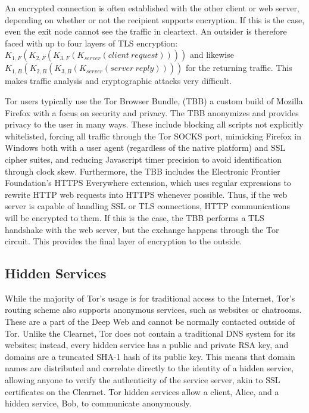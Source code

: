 
An encrypted connection is often established with the other client or web server, depending on whether or not the recipient supports encryption. If this is the case, even the exit node cannot see the traffic in cleartext. An outsider is therefore faced with up to four layers of TLS encryption: $K_{1,F}(K_{2,F}(K_{3,F}(K_{server}(client\ request))))$ and likewise $K_{1,B}(K_{2,B}(K_{3,B}(K_{server}(server\ reply))))$ for the returning traffic. This makes traffic analysis and cryptographic attacks very difficult.

Tor users typically use the Tor Browser Bundle, (TBB) a custom build of Mozilla Firefox with a focus on security and privacy. The TBB anonymizes and provides privacy to the user in many ways. These include blocking all scripts not explicitly whitelisted, forcing all traffic through the Tor SOCKS port, mimicking Firefox in Windows both with a user agent (regardless of the native platform) and SSL cipher suites, and reducing Javascript timer precision to avoid identification through clock skew. Furthermore, the TBB includes the Electronic Frontier Foundation's HTTPS Everywhere extension, which uses regular expressions to rewrite HTTP web requests into HTTPS whenever possible. Thus, if the web server is capable of handling SSL or TLS connections, HTTP communications will be encrypted to them. If this is the case, the TBB performs a TLS handshake with the web server, but the exchange happens through the Tor circuit. This provides the final layer of encryption to the outside.

\subsection{Hidden Services}

While the majority of Tor's usage is for traditional access to the Internet, Tor's routing scheme also supports anonymous services, such as websites or chatrooms. These are a part of the Deep Web and cannot be normally contacted outside of Tor. Unlike the Clearnet, Tor does not contain a traditional DNS system for its websites; instead, every hidden service has a public and private RSA key, and domains are a truncated SHA-1 hash of its public key. This means that domain names are distributed and correlate directly to the identity of a hidden service, allowing anyone to verify the authenticity of the service server, akin to SSL certificates on the Clearnet. Tor hidden services allow a client, Alice, and a hidden service, Bob, to communicate anonymously.\cite{TorOverview}

